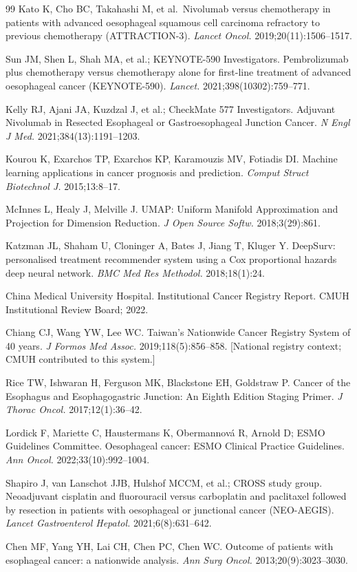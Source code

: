 \documentclass[12pt,a4paper]{article}
\begin{document}
\begin{thebibliography}{99}
Kato K, Cho BC, Takahashi M, et al.\ Nivolumab versus chemotherapy in
patients with advanced oesophageal squamous cell carcinoma refractory
to previous chemotherapy (ATTRACTION-3).
\textit{Lancet Oncol.} 2019;20(11):1506--1517.

Sun JM, Shen L, Shah MA, et al.; KEYNOTE-590 Investigators.
Pembrolizumab plus chemotherapy versus chemotherapy alone for first-line
treatment of advanced oesophageal cancer (KEYNOTE-590).
\textit{Lancet.} 2021;398(10302):759--771.

Kelly RJ, Ajani JA, Kuzdzal J, et al.; CheckMate 577 Investigators.
Adjuvant Nivolumab in Resected Esophageal or Gastroesophageal Junction
Cancer. \textit{N Engl J Med.} 2021;384(13):1191--1203.

Kourou K, Exarchos TP, Exarchos KP, Karamouzis MV, Fotiadis DI.
Machine learning applications in cancer prognosis and prediction.
\textit{Comput Struct Biotechnol J.} 2015;13:8--17.

McInnes L, Healy J, Melville J. UMAP: Uniform Manifold Approximation
and Projection for Dimension Reduction.
\textit{J Open Source Softw.} 2018;3(29):861.

Katzman JL, Shaham U, Cloninger A, Bates J, Jiang T, Kluger Y.
DeepSurv: personalised treatment recommender system using a Cox
proportional hazards deep neural network.
\textit{BMC Med Res Methodol.} 2018;18(1):24.

China Medical University Hospital. Institutional Cancer Registry Report.
CMUH Institutional Review Board; 2022.

Chiang CJ, Wang YW, Lee WC. Taiwan's Nationwide Cancer Registry System
of 40 years. \textit{J Formos Med Assoc.} 2019;118(5):856--858.
[National registry context; CMUH contributed to this system.]

Rice TW, Ishwaran H, Ferguson MK, Blackstone EH, Goldstraw P. Cancer
of the Esophagus and Esophagogastric Junction: An Eighth Edition Staging
Primer. \textit{J Thorac Oncol.} 2017;12(1):36--42.

Lordick F, Mariette C, Haustermans K, Obermannová R, Arnold D; ESMO
Guidelines Committee. Oesophageal cancer: ESMO Clinical Practice
Guidelines. \textit{Ann Oncol.} 2022;33(10):992--1004.

Shapiro J, van Lanschot JJB, Hulshof MCCM, et al.; CROSS study group.
Neoadjuvant cisplatin and fluorouracil versus carboplatin and paclitaxel
followed by resection in patients with oesophageal or junctional cancer
(NEO-AEGIS).
\textit{Lancet Gastroenterol Hepatol.} 2021;6(8):631--642.

Chen MF, Yang YH, Lai CH, Chen PC, Chen WC. Outcome of patients with
esophageal cancer: a nationwide analysis.
\textit{Ann Surg Oncol.} 2013;20(9):3023--3030.

\end{thebibliography}
\end{document}
